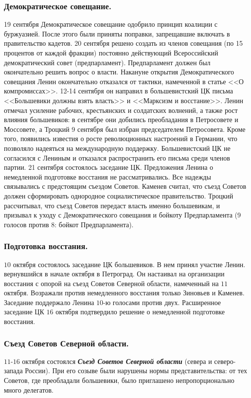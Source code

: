 \documentclass[12pt]{article}
\begin{document}
	\subsubsection{Демократическое совещание.}
	19 сентября Демократическое совещание одобрило принцип коалиции с буржуазией. После этого были приняты поправки, запрещавшие включать в правительство кадетов.  20 сентября решено создать из членов совещания (по 15 процентов от каждой фракции) постоянно действующий Всероссийский демократический совет (предпарламент). Предпарламент должен был окончательно решить вопрос о власти. Накануне открытия Демократического совещания Ленин окончательно отказался от тактики, намеченной в статье <<О компромиссах>>. 12-14 сентября он направил в большевистский ЦК письма <<Большевики должны взять власть>> и <<Марксизм и восстание>>. Ленин отмечал усиление рабочих, крестьянских и солдатских волнений, а также рост влияния большевиков: в сентябре они добились преобладания в Петросовете и Моссовете, а Троцкий 9 сентября был избран председателем Петросовета. Кроме того, появились известия о росте революционных настроений в Германии, что позволяло надеяться на международную поддержку. Большевистский ЦК не согласился с Лениным и отказался распространить его письма среди членов партии. 21 сентября состоялось заседание ЦК. Предложения Ленина о немедленной подготовке восстания не рассматривались. Все надежды связывались с предстоящим съездом Советов. Каменев считал, что съезд Советов должен сформировать однородное социалистическое правительство. Троцкий рассчитывал, что съезд Советов передаст власть именно большевикам, и призывал к уходу с Демократического совещания и бойкоту Предпарламента (9 голосов против 8: бойкот Предпарламента).
	\subsubsection{Подготовка восстания.}
	$10$ октября состоялось заседание ЦК большевиков. В нем принял участие Ленин. вернувшийся в начале октября в Петроград. Он настаивал на организации восстания с опорой на съезд Советов Северной области, намеченный на $11$ октября. Возражали против немедленного восстания только Зиновьев и Каменев. Заседание поддержало Ленина $10$-ю голосами против двух. Расширенное заседание ЦК $16$ октября подтвердило решение о немедленной подготовке восстания.
	\subsubsection{Съезд Советов Северной области.}
	$11$-$16$ октября состоялся \textbf{\textit{Съезд Советов Северной области}} (севера и северо-запада России). При его созыве были нарушены нормы представительства: от тех Советов, где преобладали большевики, было приглашено непропорционально много делегатов.
\end{document}
